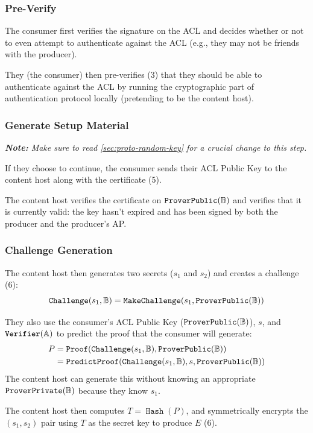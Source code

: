 \documentclass[pdftex,12pt,a4papaer,twoside,notitlepage]{report}
\newcommand{\note}[1]{\vspace{1em} \begin{spacing}{1}\textit{\textbf{Note:} #1}\end{spacing}\vspace{1em}}
\DeclareMathOperator{\hash}{\mathtt{Hash}}
\DeclareMathOperator{\Proof}{\mathtt{Proof}}
\DeclareMathOperator{\pProof}{\mathtt{PredictProof}}
\begin{document}
\subsubsection{Pre-Verify}

The consumer first verifies the signature on the ACL and decides whether or not
to even attempt to authenticate against the ACL (e.g., they may not be friends
with the producer).

They (the consumer) then pre-verifies (3) that they should be able to
authenticate against the ACL by running the cryptographic part of
authentication protocol locally (pretending to be the content host).

\subsubsection{Generate Setup Material}
\label{sec:proto-setup-material}

\note{Make sure to read \cref{sec:proto-random-key} for a crucial change to
  this step.}

If they choose to continue, the consumer sends their ACL Public Key to the
content host along with the certificate (5).

The content host verifies the certificate on $\operatorname{\mathtt{ProverPublic}}(\mathbb{B})$ and verifies that it is
currently valid: the key hasn't expired and has been signed by both the producer
and the producer's AP.

\subsubsection{Challenge Generation}

The content host then generates two secrets ($s_1$ and $s_2$) and creates a
challenge (6):
\begin{equation*}
  \operatorname{\mathtt{Challenge}}(s_1, \mathbb{B}) = \operatorname{\mathtt{MakeChallenge}}(s_1, \operatorname{\mathtt{ProverPublic}}(\mathbb{B}))
\end{equation*}

They also use the consumer's ACL Public Key ($\operatorname{\mathtt{ProverPublic}}(\mathbb{B})$), $s$, and $\operatorname{\mathtt{Verifier}}(\mathbb{A})$ to predict
the proof that the consumer will generate:
\begin{align*}
  P &= \Proof(\Cv, \allowbreak\Pv) \\
    &= \pProof(\Cv, s, \Pv)
\end{align*}
The content host can generate this without knowing an appropriate $\operatorname{\mathtt{ProverPrivate}}(\mathbb{B})$ because
they know $s_1$.

The content host then computes $T = \hash(P)$, and symmetrically encrypts the
$(s_1, s_2)$ pair using $T$ as the secret key to produce $E$ (6).
\end{document}
